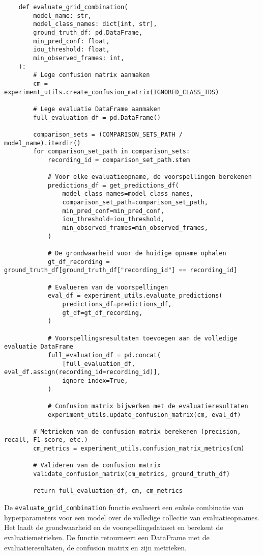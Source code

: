 \begin{listing}[H]
  \fontsize{10pt}{10pt}
  \begin{verbatim}
    def evaluate_grid_combination(
        model_name: str,
        model_class_names: dict[int, str],
        ground_truth_df: pd.DataFrame,
        min_pred_conf: float,
        iou_threshold: float,
        min_observed_frames: int,
    ):
        # Lege confusion matrix aanmaken
        cm = experiment_utils.create_confusion_matrix(IGNORED_CLASS_IDS)
        
        # Lege evaluatie DataFrame aanmaken
        full_evaluation_df = pd.DataFrame()

        comparison_sets = (COMPARISON_SETS_PATH / model_name).iterdir()
        for comparison_set_path in comparison_sets:
            recording_id = comparison_set_path.stem

            # Voor elke evaluatieopname, de voorspellingen berekenen
            predictions_df = get_predictions_df(
                model_class_names=model_class_names,
                comparison_set_path=comparison_set_path,
                min_pred_conf=min_pred_conf,
                iou_threshold=iou_threshold,
                min_observed_frames=min_observed_frames,
            )

            # De grondwaarheid voor de huidige opname ophalen
            gt_df_recording = ground_truth_df[ground_truth_df["recording_id"] == recording_id]

            # Evalueren van de voorspellingen
            eval_df = experiment_utils.evaluate_predictions(
                predictions_df=predictions_df,
                gt_df=gt_df_recording,
            )

            # Voorspellingsresultaten toevoegen aan de volledige evaluatie DataFrame
            full_evaluation_df = pd.concat(
                [full_evaluation_df, eval_df.assign(recording_id=recording_id)],
                ignore_index=True,
            )

            # Confusion matrix bijwerken met de evaluatieresultaten
            experiment_utils.update_confusion_matrix(cm, eval_df)

        # Metrieken van de confusion matrix berekenen (precision, recall, F1-score, etc.)
        cm_metrics = experiment_utils.confusion_matrix_metrics(cm)

        # Valideren van de confusion matrix
        validate_confusion_matrix(cm_metrics, ground_truth_df)

        return full_evaluation_df, cm, cm_metrics
  \end{verbatim}
  \caption[Functie voor het evalueren van een enkele combinatie van hyperparameters]{
      \label{listing:evaluate-grid-combination}
      De \texttt{evaluate\_grid\_combination} functie evalueert een enkele combinatie van hyperparameters voor een model over de volledige collectie van evaluatieopnames.
      Het laadt de grondwaarheid en de voorspellingsdataset en berekent de evaluatiemetrieken.
      De functie retourneert een DataFrame met de evaluatieresultaten, de confusion matrix en zijn metrieken.
    }
\end{listing}

